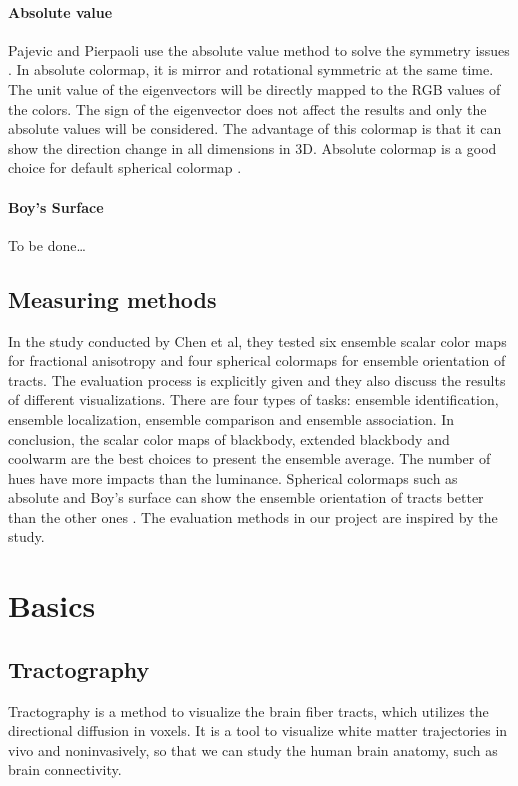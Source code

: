 \documentclass[hyperref, plainreport, noproblem]{cgvpub1}
\begin{document}
\subsubsection*{Absolute value}
Pajevic and Pierpaoli use the absolute value method to solve the symmetry issues \cite{pajevic}. In absolute colormap, it is mirror and rotational symmetric at the same time. The unit value of the eigenvectors will be directly mapped to the RGB values of the colors. The sign of the eigenvector does not affect the results and only the absolute values will be considered. The advantage of this colormap is that it can show the direction change in all dimensions in 3D. Absolute colormap is a good choice for default spherical colormap \cite{moreland2019}.

\subsubsection*{Boy’s Surface}  
To be done…

\section{Measuring methods}
In the study conducted by Chen et al, they tested six ensemble scalar color maps for fractional anisotropy and four spherical colormaps for ensemble orientation of tracts. The evaluation process is explicitly given and they also discuss the results of different visualizations. There are four types of tasks: ensemble identification, ensemble localization, ensemble comparison and ensemble association. In conclusion, the scalar color maps of blackbody, extended blackbody and coolwarm are the best choices to present the ensemble average. The number of hues have more impacts than the luminance. Spherical colormaps such as absolute and Boy’s surface can show the ensemble orientation of tracts better than the other ones \cite{moreland2019}. The evaluation methods in our project are inspired by the study.

\chapter{Basics}

\section{Tractography}
Tractography is a method to visualize the brain fiber tracts, which utilizes the directional diffusion in voxels. It is a tool to visualize white matter trajectories in vivo and noninvasively, so that we can study the human brain anatomy, such as brain connectivity.
\end{document}

